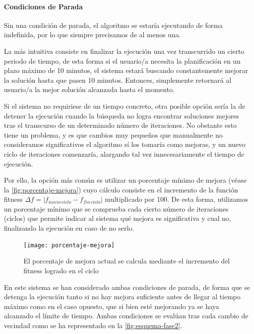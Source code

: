 \paragraph{Condiciones de Parada}
\label{apartado:condiciones-parada}

Sin una condición de parada, el algoritmo se estaría ejecutando de forma indefinida, por lo que siempre precisamos de al menos una.

La más intuitiva consiste en finalizar la ejecución una vez transcurrido un cierto periodo de tiempo, de esta forma si el usuario/a necesita la planificación en un plazo máximo de 10 minutos, el sistema estará buscando constantemente mejorar la solución hasta que pasen 10 minutos. Entonces, simplemente retornará al usuario/a la mejor solución alcanzada hasta el momento.

Si el sistema no requiriese de un tiempo concreto, otra posible opción sería la de detener la ejecución cuando la búsqueda no logra encontrar soluciones mejores tras el transcurso de un determinado número de iteraciones. No obstante esto tiene un problema, y es que cambios muy pequeños que manualmente no consideramos significativos el algoritmo sí los tomaría como mejoras, y un nuevo ciclo de iteraciones comenzaría, alargando tal vez innecesariamente el tiempo de ejecución. 

Por ello, la opción más común es utilizar un porcentaje mínimo de mejora (véase la \autoref{fig:porcentaje-mejora}) cuyo cálculo consiste en el incremento de la función fitness $\Delta f = |f_{inicio\, ciclo}-f_{fin\, ciclo}|$ multiplicado por 100. De esta forma, utilizamos un porcentaje mínimo que se comprueba cada cierto número de iteraciones (ciclos) que permite indicar al sistema qué mejora es significativa y cual no, finalizando la ejecución en caso de no serlo.

\begin{figure}
    \centering
    \texttt{[image: porcentaje-mejora]}
    \caption{El porcentaje de mejora actual se calcula mediante el incremento del fitness logrado en el ciclo}
    \label{fig:porcentaje-mejora}
\end{figure}

En este sistema se han considerado ambas condiciones de parada, de forma que se detenga la ejecución tanto si no hay mejora suficiente antes de llegar al tiempo máximo como en el caso opuesto, que si bien esté mejorando ya se haya alcanzado el límite de tiempo. Ambas condiciones se evalúan tras cada cambio de vecindad como se ha representado en la \autoref{fig:esquema-fase2}.

